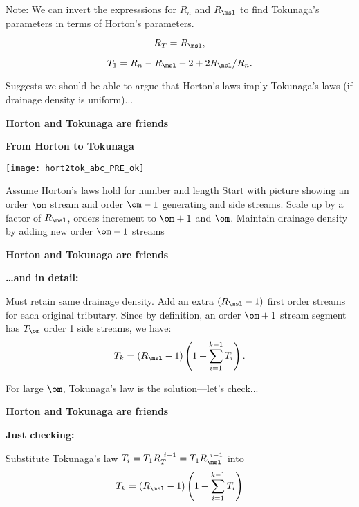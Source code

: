 \begin{frame}[label=]
\begin{frame}[label=]
\begin{frame}[label=]
\begin{frame}[label=]
\begin{frame}[label=]
\begin{frame}[label=]
\begin{frame}[label=]
\begin{frame}[label=]
     Note: We can invert the expresssions
      for $R_n$ and $R_\msl$ to find Tokunaga's
      parameters in terms of Horton's parameters.
     
      $$
      R_T = R_\msl,
      $$
    
      $$
      T_1  =  R_n - R_\msl - 2 + 2R_\msl/R_n.
      $$
     
      Suggests we should be able to argue that Horton's laws
      imply Tokunaga's laws (if drainage density is uniform)...
    
  


\begin{frame}[label=]
  \textbf{Horton and Tokunaga are friends}

  \textbf{From Horton to Tokunaga\cite{dodds1999a}}
          
      \texttt{[image: hort2tok\_abc\_PRE\_ok]}
      
      
       Assume Horton's laws hold for number and length
       Start with picture showing an order $\om$ stream
        and order $\om-1$ generating and side streams.
       Scale up by a factor of $R_\msl$, orders increment
        to $\om+1$ and $\om$.
       Maintain drainage density by adding new order $\om-1$ streams
      
          
  


\begin{frame}[label=]
  \textbf{Horton and Tokunaga are friends}

  \textbf{\ldots and in detail:}
    
     Must retain same drainage density.
     Add an extra $(R_\msl-1)$ first order streams
      for each original tributary.
     Since by definition, an order $\om+1$ stream segment
      has $T_{\om}$ order 1 side streams, we have: 
      {
        $$
        T_{k} = (R_\msl-1)
        \left( 
          1 + 
          \sum_{i=1}^{k-1} T_{i}  
        \right).
        $$
      }
    
      For large $\om$, Tokunaga's law is the solution---let's check...
    

  


\begin{frame}[label=]
  \textbf{Horton and Tokunaga are friends}

  \textbf{Just checking:}
    
     Substitute Tokunaga's law $T_i=T_1 R_T^{\ i-1} = T_1 R_\msl^{\ i-1}$ into
      $$
      T_{k} = (R_\msl-1)
      \left(
        1 +
        \sum_{i=1}^{k-1} T_{i}  
      \right)
      $$
    

\end{frame}
\end{frame}
\end{frame}
\end{frame}
\end{frame}
\end{frame}
\end{frame}
\end{frame}
\end{frame}
\end{frame}
\end{frame}
